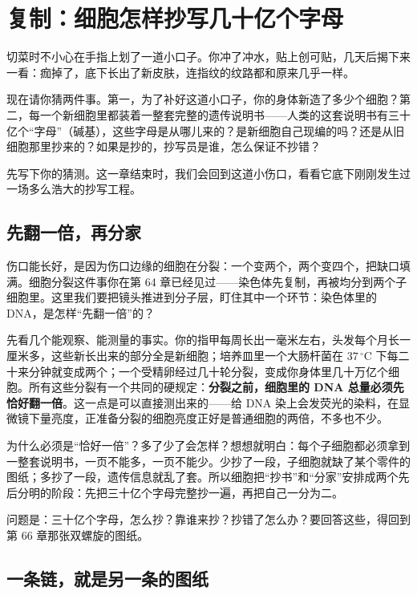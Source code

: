 \chapter{复制：细胞怎样抄写几十亿个字母}

\begin{kaichang}
切菜时不小心在手指上划了一道小口子。你冲了冲水，贴上创可贴，几天后揭下来一看：痂掉了，底下长出了新皮肤，连指纹的纹路都和原来几乎一样。

现在请你猜两件事。第一，为了补好这道小口子，你的身体新造了多少个细胞？第二，每一个新细胞里都装着一整套完整的遗传说明书——人类的这套说明书有三十亿个“字母”（碱基），这些字母是从哪儿来的？是新细胞自己现编的吗？还是从旧细胞那里抄来的？如果是抄的，抄写员是谁，怎么保证不抄错？

先写下你的猜测。这一章结束时，我们会回到这道小伤口，看看它底下刚刚发生过一场多么浩大的抄写工程。
\end{kaichang}

\section{先翻一倍，再分家}

伤口能长好，是因为伤口边缘的细胞在分裂：一个变两个，两个变四个，把缺口填满。细胞分裂这件事你在第 64 章已经见过——染色体先复制，再被均分到两个子细胞里。这里我们要把镜头推进到分子层，盯住其中一个环节：染色体里的 DNA，是怎样“先翻一倍”的？

先看几个能观察、能测量的事实。你的指甲每周长出一毫米左右，头发每个月长一厘米多，这些新长出来的部分全是新细胞；培养皿里一个大肠杆菌在 $37\,^{\circ}\mathrm{C}$ 下每二十来分钟就变成两个；一个受精卵经过几十轮分裂，变成你身体里几十万亿个细胞。所有这些分裂有一个共同的硬规定：\textbf{分裂之前，细胞里的 DNA 总量必须先恰好翻一倍}。这一点是可以直接测出来的——给 DNA 染上会发荧光的染料，在显微镜下量亮度，正准备分裂的细胞亮度正好是普通细胞的两倍，不多也不少。

为什么必须是“恰好一倍”？多了少了会怎样？想想就明白：每个子细胞都必须拿到一整套说明书，一页不能多，一页不能少。少抄了一段，子细胞就缺了某个零件的图纸；多抄了一段，遗传信息就乱了套。所以细胞把“抄书”和“分家”安排成两个先后分明的阶段：先把三十亿个字母完整抄一遍，再把自己一分为二。

问题是：三十亿个字母，怎么抄？靠谁来抄？抄错了怎么办？要回答这些，得回到第 66 章那张双螺旋的图纸。

\section{一条链，就是另一条的图纸}


